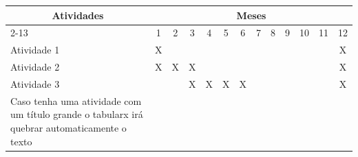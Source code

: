 \documentclass[11pt]{article}
\begin{document}
\begin{table}[h]
\centering
\begin{tabularx}{\textwidth}{|X|cccccccccccc|}
\hline
\multicolumn{1}{|c|}{\multirow{2}{*}{Atividades}} &
    \multicolumn{12}{c|}{Meses} \\ \cline{2-13} 
 &
    \multicolumn{1}{c|}{1} &
    \multicolumn{1}{c|}{2} &
    \multicolumn{1}{c|}{3} &
    \multicolumn{1}{c|}{4} &
    \multicolumn{1}{c|}{5} &
    \multicolumn{1}{c|}{6} &
    \multicolumn{1}{c|}{7} &
    \multicolumn{1}{c|}{8} &
    \multicolumn{1}{c|}{9} &
    \multicolumn{1}{c|}{10} &
    \multicolumn{1}{c|}{11} &
    12 \\ \hline
Atividade 1 &
    \multicolumn{1}{c|}{X} & %
    \multicolumn{1}{c|}{ } & %
    \multicolumn{1}{c|}{ } & %
    \multicolumn{1}{c|}{ } & %
    \multicolumn{1}{c|}{ } & %
    \multicolumn{1}{c|}{ } & %
    \multicolumn{1}{c|}{ } & %
    \multicolumn{1}{c|}{ } & %
    \multicolumn{1}{c|}{ } & %
    \multicolumn{1}{c|}{ } & %
    \multicolumn{1}{c|}{ } & %
    X \\ \hline %
Atividade 2 &
    \multicolumn{1}{c|}{X} & %
    \multicolumn{1}{c|}{X} & %
    \multicolumn{1}{c|}{X} & %
    \multicolumn{1}{c|}{ } & %
    \multicolumn{1}{c|}{ } & %
    \multicolumn{1}{c|}{ } & %
    \multicolumn{1}{c|}{ } & %
    \multicolumn{1}{c|}{ } & %
    \multicolumn{1}{c|}{ } & %
    \multicolumn{1}{c|}{ } & %
    \multicolumn{1}{c|}{ } & %
    X \\ \hline %
Atividade 3 &
    \multicolumn{1}{c|}{ } & %
    \multicolumn{1}{c|}{ } & %
    \multicolumn{1}{c|}{X} & %
    \multicolumn{1}{c|}{X} & %
    \multicolumn{1}{c|}{X} & %
    \multicolumn{1}{c|}{X} & %
    \multicolumn{1}{c|}{ } & %
    \multicolumn{1}{c|}{ } & %
    \multicolumn{1}{c|}{ } & %
    \multicolumn{1}{c|}{ } & %
    \multicolumn{1}{c|}{ } & %
    X \\ \hline %
 Caso tenha uma atividade com um título grande o tabularx irá quebrar automaticamente o texto &
    \multicolumn{1}{c|}{ } & %
    \multicolumn{1}{c|}{ } & %
    \multicolumn{1}{c|}{ } & %
    \multicolumn{1}{c|}{ } & %
    \multicolumn{1}{c|}{ } & %
    \multicolumn{1}{c|}{ } & %
    \multicolumn{1}{c|}{ } & %
    \multicolumn{1}{c|}{ } & %
    \multicolumn{1}{c|}{ } & %
    \multicolumn{1}{c|}{ } & %

\end{tabularx}
\end{table}
\end{document}
